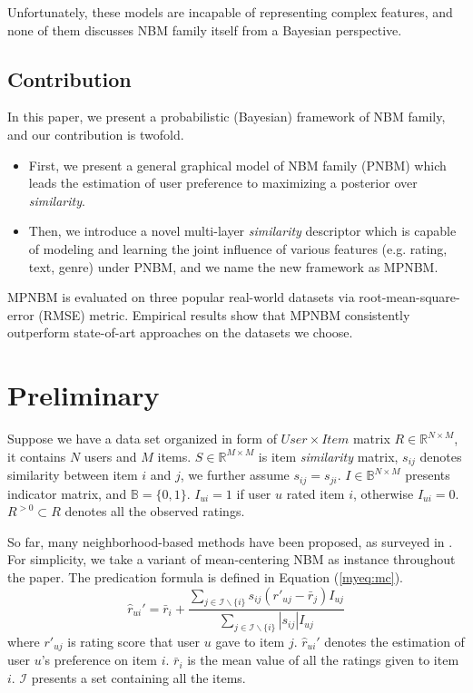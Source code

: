 \documentclass[conference]{IEEEtran}
\begin{document}
Unfortunately, these models are incapable of representing complex features, and none of them discusses NBM family itself from a Bayesian perspective.
\subsection{Contribution}

In this paper, we present a probabilistic (Bayesian) framework of NBM family, and our contribution is twofold.

\begin{itemize}
\item First, we present a general graphical model of NBM family (PNBM) which leads the estimation of user preference to maximizing a posterior over \emph{similarity}.
\item Then, we introduce a novel multi-layer \emph{similarity} descriptor which  is capable of modeling and learning the joint influence of various features (e.g. rating, text, genre) under PNBM, and we name the new framework as MPNBM.
\end{itemize}

MPNBM is evaluated on three popular real-world datasets via root-mean-square-error (RMSE) metric. Empirical results show that MPNBM consistently outperform state-of-art approaches  on the datasets we choose.

\section{Preliminary}
\label{preliminary}
Suppose we have a data set organized in form of $User \times Item$ matrix $R \in \mathbb{R}^{N\times M}$, it contains $N$ users and $M$ items. $S \in \mathbb{R}^{M\times M}$ is item \emph{similarity} matrix, $s_{ij}$ denotes similarity between item $i$ and $j$, we further assume $s_{ij}=s_{ji}$. $I \in \mathbb{B}^{N\times M}$ presents indicator matrix, and $ \mathbb{B} =  \{ 0,1\}$. $I_{ui}=1$ if user $u$ rated item $i$, otherwise $I_{ui}=0$. $R^{>0} \subset  R $ denotes all the observed ratings.

So far, many neighborhood-based methods have been proposed, as surveyed in \cite{desrosiers2011comprehensive}. For simplicity, we take a variant of mean-centering NBM \cite{resnick1994grouplens} as instance throughout the paper. The predication formula is defined in Equation (\ref{myeq:mc}).
\begin{equation}\label{myeq:mc}
 \hat{r}_{ui}' = \bar{r}_{i} + \frac{\sum_{j\in \mathcal{I} \backslash \{i\}}s_{ij}(r'_{uj}-\bar{r}_j)I_{uj}}{\sum_{j \in \mathcal{I} \backslash \{i\}}|s_{ij}|I_{uj}}
\end{equation}
where  $r'_{uj}$ is rating score that user $u$ gave to item $j$. $\hat{r}_{ui}'$ denotes the estimation of user $u$'s preference on item $i$. $\bar{r}_i$ is the mean value of all the ratings given to item $i$. $\mathcal{I}$ presents a set containing all the items.
\end{document}
